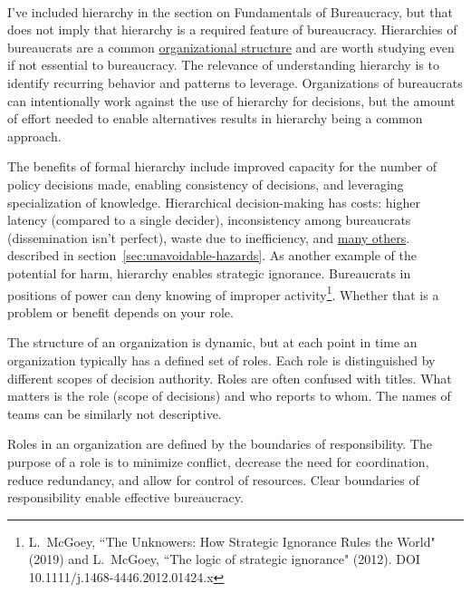 \ \\

I've included hierarchy in the section on Fundamentals of Bureaucracy, but that does not imply that hierarchy is a required feature of bureaucracy. Hierarchies of bureaucrats are a common \href{https://en.wikipedia.org/wiki/Organizational_structure}{organizational structure} 
and are worth studying even if not essential to bureaucracy. The relevance of understanding hierarchy is to identify recurring behavior and patterns to leverage.
Organizations of bureaucrats can intentionally work against the use of hierarchy for decisions, but the amount of effort needed to enable alternatives results in hierarchy being a common approach.

The benefits of formal hierarchy include improved capacity for the number of policy decisions made, enabling consistency of decisions, and leveraging specialization of knowledge. 
Hierarchical decision-making has costs: higher latency (compared to a single decider), inconsistency among bureaucrats (dissemination isn't perfect), waste due to inefficiency, and 
\hyperref[sec:unavoidable-hazards]{many others}.
\ifsectionref
described in section~\ref{sec:unavoidable-hazards}. 
\fi
As another example of the potential for harm, hierarchy enables strategic ignorance. Bureaucrats in positions of power can deny knowing of improper activity\footnote{L.~McGoey, ``The Unknowers: How Strategic Ignorance Rules the World" (2019)
and 
L.~McGoey, ``The logic of strategic ignorance" (2012). DOI 
10.1111/j.1468-4446.2012.01424.x
}. Whether that is a problem or benefit depends on your role. 



The structure of an organization is dynamic, but at each point in time an organization typically has a defined set of roles. Each role is distinguished by different scopes of decision authority. 
Roles are often confused with titles. What matters is the role (scope of decisions) and who reports to whom. The names of teams can be similarly not descriptive.




Roles in an organization are defined by the boundaries of responsibility. The purpose of a role is to minimize conflict, decrease the need for coordination, reduce redundancy, and allow for control of resources. Clear boundaries of responsibility  enable effective bureaucracy. 


